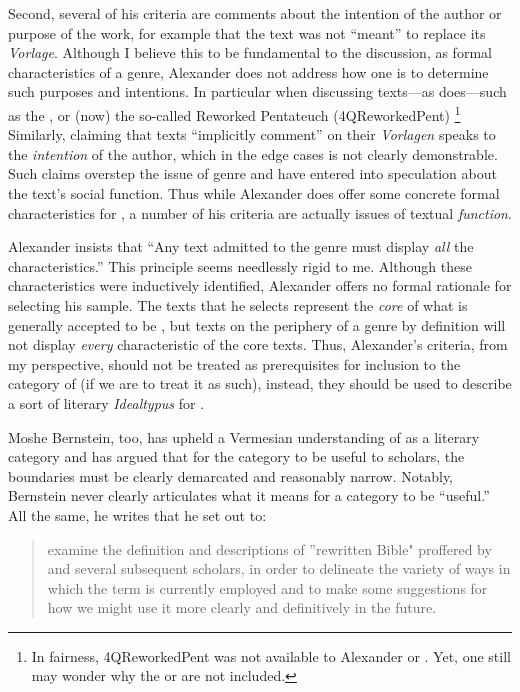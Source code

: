Second, several of his criteria are comments about the intention of the author or purpose of the work, for example that the \rwb text was not ``meant'' to replace its \emph{Vorlage}. Although I believe this to be fundamental to the discussion, as formal characteristics of a genre, Alexander does not address how one is to determine such purposes and intentions.  In particular when discussing texts---as \vermes does---such as the \pTarg, or (now) the so-called Reworked Pentateuch (4QReworkedPent)%
%
\footnote{In fairness, 4QReworkedPent was not available to Alexander or \vermes. Yet, one still may wonder why   the \lxx or \sampent are not included.}
%
Similarly, claiming that \rwb texts ``implicitly comment'' on their \emph{Vorlagen} speaks to the \emph{intention} of the author, which in the edge cases is not clearly demonstrable. Such claims overstep the issue of genre and have entered into speculation about the text's social function. Thus while Alexander does offer some concrete formal characteristics for \rwb, a number of his criteria are actually issues of textual \emph{function}.

Alexander insists that ``Any text admitted to the genre must display \emph{all} the characteristics.''\autocite[119 n. 11]{alexander_carson-williamson1988} This principle seems needlessly rigid to me. Although these characteristics were inductively identified,  Alexander offers no formal rationale for selecting his sample. The texts that he selects represent the \emph{core} of what is generally accepted to be \rwb, but texts on the periphery of a genre by definition will not display \emph{every} characteristic of the core texts. Thus, Alexander's criteria, from my perspective, should not be treated as prerequisites for inclusion to the category of \rwb (if we are to treat it as such), instead, they should be used to describe a sort of literary \emph{Idealtypus}
%
%
for \rwb. 

Moshe Bernstein, too, has upheld a Vermesian understanding of \rwb as a literary category and has argued that for the category to be useful to scholars, the boundaries must be clearly demarcated and reasonably narrow.\autocite{bernstein_textus2005} Notably, Bernstein never clearly articulates what it means for a category to be ``useful.'' All the same, he writes that he set out to: 

\begin{quote}
    examine the definition and descriptions of ''rewritten Bible" proffered by \vermes and several subsequent scholars, in order to delineate the variety of ways in which the term is currently employed and to make some suggestions for how we might use it more clearly and definitively in the future.\autocite[171--172]{bernstein_textus2005}
\end{quote}


